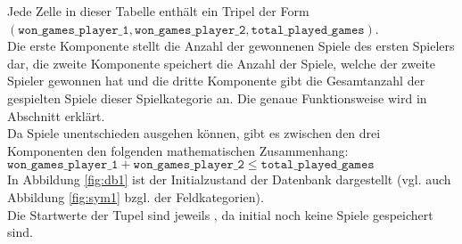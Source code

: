 Jede Zelle in dieser Tabelle enthält ein Tripel der Form \\$( \mathtt{won\_games\_player\_1}, \mathtt{won\_games\_player\_2}, \mathtt{total\_played\_games})$. 
\\Die erste Komponente stellt die Anzahl der gewonnenen Spiele des ersten Spielers dar, die zweite Komponente speichert die Anzahl der Spiele, welche der zweite Spieler gewonnen hat und die dritte Komponente gibt die Gesamtanzahl der gespielten Spiele dieser Spielkategorie an. Die genaue Funktionsweise wird in Abschnitt  erklärt.
\\Da Spiele unentschieden ausgehen können, gibt es zwischen den drei Komponenten den folgenden mathematischen Zusammenhang: 
\\$\mathtt{won\_games\_player\_1} + \mathtt{won\_games\_player\_2} \le \mathtt{total\_played\_games}$
\\In Abbildung \ref{fig:db1} ist der Initialzustand der Datenbank dargestellt (vgl. auch Abbildung \ref{fig:sym1} bzgl. der Feldkategorien). 
\\
Die Startwerte der Tupel sind jeweils , da initial noch keine Spiele gespeichert sind.
